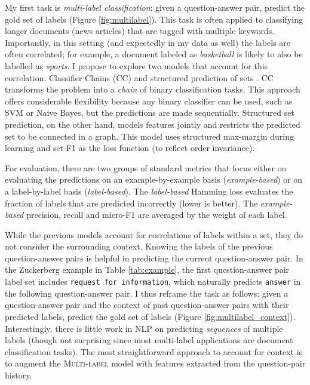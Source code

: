  My first task is \emph{multi-label classification}: given a question-answer pair, predict the gold set of labels (Figure \ref{fig:multilabel}). This task is often applied to classifying longer documents (news articles) that are tagged with multiple keywords. Importantly, in this setting (and expectedly in my data as well) the labels are often correlated; for example, a document labeled as \textit{basketball} is likely to also be labelled as \textit{sports}. I propose to explore two models that account for this correlation: Classifier Chains (\textsc{CC}) \cite{Read:2011} and structured prediction of sets \cite{Rabinovich:2017}. \textsc{CC} transforms the problem into a \emph{chain} of binary classification tasks. This approach offers considerable flexibility because any binary classifier can be used, such as SVM or Naive Bayes, but the predictions are made sequentially. Structured set prediction, on the other hand, models features jointly and restricts the predicted set to be connected in a graph. This model uses structured max-margin during learning and set-F1 as the loss function (to reflect order invariance).

For evaluation, there are two groups of standard metrics that focus either on evaluating the predictions on an example-by-example basis (\emph{example-based}) or on a label-by-label basis (\emph{label-based}). The \emph{label-based} Hamming loss evaluates the fraction of labels that are predicted incorrectly (lower is better). The \emph{example-based} precision, recall and micro-F1 are averaged by the weight of each label. 

 While the previous models account for correlations of labels within a set, they do not consider the surrounding context. Knowing the labels of the previous question-answer pairs is helpful in predicting the current question-answer pair. In the Zuckerberg example in Table \ref{tab:example}, the first question-answer pair label set includes \texttt{request for information}, which naturally predicts \texttt{answer} in the following question-answer pair. I thus reframe the task as follows: given a question-answer pair and the context of past question-answer pairs with their predicted labels, predict the gold set of labels (Figure \ref{fig:multilabel_context}).  Interestingly, there is little work in NLP on predicting \emph{sequences} of multiple labels (though not surprising since most multi-label applications are document classification tasks). The most straightforward approach to account for context is to augment the \textsc{Multi-label} model with features extracted from the question-pair history. 

